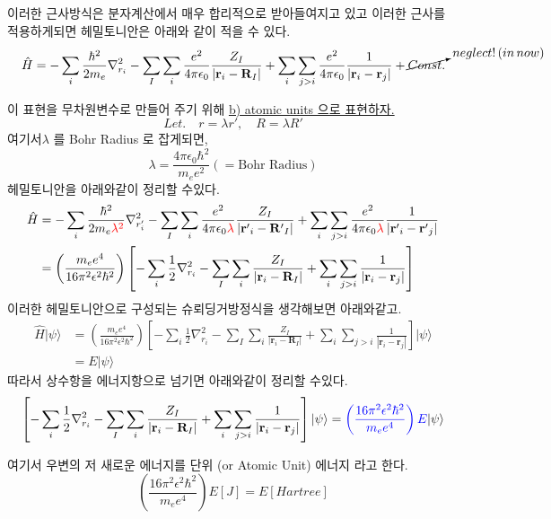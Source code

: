 \documentclass[10pt]{article}
\begin{document}
\begin{enumerate}[label=3)]
\begin{enumerate}[label=\(\mathrm{i}\))]
\begin{tcolorbox}[enhanced, breakable, colback=gray!10, colframe=black, title=Definition: Born-oppenheimer Approximation]
\begin{minipage}[t]{0.48\textwidth}
\end{minipage}

\end{tcolorbox}

이러한 근사방식은 분자계산에서 매우 합리적으로 받아들여지고 있고 이러한 근사를 적용하게되면 헤밀토니안은 아래와 같이 적을 수 있다. 
\[
\hat{H} = -\sum_i \frac{\hbar^2}{2 m_e}\nabla_{r_i}^2 -  \sum_I \sum_i \frac{e^2}{4\pi \epsilon_0}\frac{Z_I}{|\mathbf{r}_i-\mathbf{R}_I|}
+ \sum_i \sum_{j>i} \frac{e^2}{4\pi \epsilon_0} \frac{1}{|\mathbf{r}_i - \mathbf{r}_j|} + \cancelto{neglect! \, (in \,now)}{Const.}
\]

이 표현을 무차원변수로 만들어 주기 위해 \underline{b) atomic units 으로 표현하자.} 
\[Let.\quad r=\lambda r', \quad R=\lambda R'\]
여기서\(\lambda\) 를 Bohr Radius 로 잡게되면,
\[\lambda=\frac{4\pi\epsilon_0\hbar^2}{m_ee^2} (=\text{Bohr Radius})\]
헤밀토니안을 아래와같이 정리할 수있다. 
\begin{align*}
\hat{H} &= -\sum_i \frac{\hbar^2}{2 m_e{\color{red} {\lambda^2}}}\nabla_{r_i'}^2 -  \sum_I \sum_i \frac{e^2}{4\pi \epsilon_0{\color{red} {\lambda}}}\frac{Z_I}{|\mathbf{r'}_i-\mathbf{R'}_I|}
+ \sum_i \sum_{j>i} \frac{e^2}{4\pi \epsilon_0{\color{red} {\lambda}}} \frac{1}{|\mathbf{r'}_i - \mathbf{r'}_j|} \\
&=\left(\frac{m_ee^4}{16\pi^2\epsilon^2\hbar^2}\right)\left[-\sum_i \frac{1}{2}\nabla_{r_i}^2 -  \sum_I \sum_i \frac{Z_I}{|\mathbf{r}_i-\mathbf{R}_I|}
+ \sum_i \sum_{j>i} \frac{1}{|\mathbf{r}_i - \mathbf{r}_j|}\right]
\end{align*}
이러한 헤밀토니안으로 구성되는 슈뢰딩거방정식을 생각해보면 아래와같고. 
\begin{align*}
\hat{H}\vert\psi\rangle &= \left(\frac{m_ee^4}{16\pi^2\epsilon^2\hbar^2}\right)\left[-\sum_i \frac{1}{2}\nabla_{r_i}^2 -  \sum_I \sum_i \frac{Z_I}{|\mathbf{r}_i-\mathbf{R}_I|}
+ \sum_i \sum_{j>i} \frac{1}{|\mathbf{r}_i - \mathbf{r}_j|}\right]\vert\psi\rangle\\
&=E\vert\psi\rangle
\end{align*}
따라서 상수항을 에너지항으로 넘기면 아래와같이 정리할 수있다. 
\[
\left[-\sum_i \frac{1}{2}\nabla_{r_i}^2 -  \sum_I \sum_i \frac{Z_I}{|\mathbf{r}_i-\mathbf{R}_I|}
+ \sum_i \sum_{j>i} \frac{1}{|\mathbf{r}_i - \mathbf{r}_j|}\right]\vert\psi\rangle = {\color{blue}\left(\frac{16\pi^2\epsilon^2\hbar^2}{m_ee^4}\right)E} \vert\psi\rangle
\]

여기서 우변의 저 새로운 에너지를  단위 (or Atomic Unit) 에너지 라고 한다. 
\[
\left(\frac{16\pi^2\epsilon^2\hbar^2}{m_ee^4}\right)E[J] = E[Hartree]
\]



\end{enumerate}
\end{enumerate}
\end{document}
